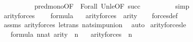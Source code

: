 \begin{isabellebody}
\ \ \ \ \ \ \ \ \ \ pred{\isacharunderscore}{\kern0pt}mono{\isacharbrackleft}{\kern0pt}OF\ {\isacharunderscore}{\kern0pt}\ Forall{\isacharparenleft}{\kern0pt}{}{\isacharparenright}{\kern0pt}{\isacharbrackright}{\kern0pt}\ Un{\isacharunderscore}{\kern0pt}le{\isacharbrackleft}{\kern0pt}OF\ {\isacartoucheopen}{}{\isasymle}succ{\isacharparenleft}{\kern0pt}{\isacharunderscore}{\kern0pt}{\isacharparenright}{\kern0pt}{\isacartoucheclose}{\isacharbrackright}{\kern0pt}\isanewline
\ \ \ \ \ \ \ \ \isamarkupfalse%
\ simp\isanewline
\ \ \ \ \isamarkupfalse%
\isanewline
\ \ \isamarkupfalse%
\isanewline
{}\isamarkupfalse%
%
\endisatagproof
{\isafoldproof}%
%
\isadelimproof
\isanewline
%
\endisadelimproof
\isanewline
{}\isamarkupfalse%
\ arity{\isacharunderscore}{\kern0pt}forces\ {\isacharcolon}{\kern0pt}\isanewline
\ \ \ {\isachardoublequoteopen}{\isasymphi}{\isasymin}formula{\isachardoublequoteclose}\isanewline
\ \ \ {\isachardoublequoteopen}arity{\isacharparenleft}{\kern0pt}forces{\isacharparenleft}{\kern0pt}{\isasymphi}{\isacharparenright}{\kern0pt}{\isacharparenright}{\kern0pt}\ {\isasymle}\ {}{\isacharhash}{\kern0pt}{\isacharplus}{\kern0pt}arity{\isacharparenleft}{\kern0pt}{\isasymphi}{\isacharparenright}{\kern0pt}{\isachardoublequoteclose}\isanewline
%
\isadelimproof
\ \ %
\endisadelimproof
%
\isatagproof
{}\isamarkupfalse%
\ forces{\isacharunderscore}{\kern0pt}def\isanewline
\ \ \isamarkupfalse%
\ assms\ arity{\isacharunderscore}{\kern0pt}forces{\isacharprime}{\kern0pt}\ le{\isacharunderscore}{\kern0pt}trans\ nat{\isacharunderscore}{\kern0pt}simp{\isacharunderscore}{\kern0pt}union\ \isamarkupfalse%
\ auto%
\endisatagproof
{\isafoldproof}%
%
\isadelimproof
\isanewline
%
\endisadelimproof
\isanewline
{}\isamarkupfalse%
\ arity{\isacharunderscore}{\kern0pt}forces{\isacharunderscore}{\kern0pt}le\ {\isacharcolon}{\kern0pt}\isanewline
\ \ \ {\isachardoublequoteopen}{\isasymphi}{\isasymin}formula{\isachardoublequoteclose}\ {\isachardoublequoteopen}n{\isasymin}nat{\isachardoublequoteclose}\ {\isachardoublequoteopen}arity{\isacharparenleft}{\kern0pt}{\isasymphi}{\isacharparenright}{\kern0pt}\ {\isasymle}\ n{\isachardoublequoteclose}\isanewline
\ \ \ {\isachardoublequoteopen}arity{\isacharparenleft}{\kern0pt}forces{\isacharparenleft}{\kern0pt}{\isasymphi}{\isacharparenright}{\kern0pt}{\isacharparenright}{\kern0pt}\ {\isasymle}\ {}{\isacharhash}{\kern0pt}{\isacharplus}{\kern0pt}n{\isachardoublequoteclose}\isanewline

\end{isabellebody}
